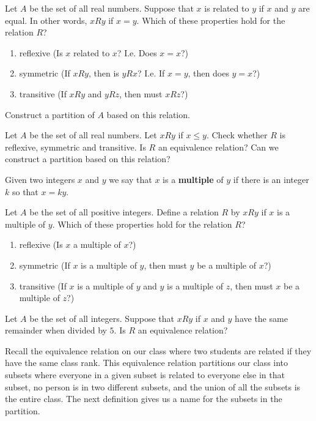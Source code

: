 \begin{prb}
\label{equiv1}
Let $A$ be the set of all real numbers. Suppose that $x$ is related to $y$ if $x$ and $y$ are equal. In other words, $xRy$ if $x=y$.  Which of these properties hold for the relation $R$?
\begin{enumerate}
\item reflexive (Is $x$ related to $x$? I.e. Does $x=x$?)
\item symmetric (If $xRy$, then is $yRx$? I.e. If $x=y$, then does $y=x$?)
\item transitive (If $xRy$ and $yRz$, then must $xRz$?)
\end{enumerate}
Construct a partition of $A$ based on this relation.
\end{prb}

\begin{prb}
Let $A$ be the set of all real numbers.  Let $xRy$ if $x \leq y$.   Check whether $R$ is reflexive, symmetric and transitive.  Is $R$ an equivalence relation?  Can we construct a partition based on this relation?
\end{prb}

\begin{dfn}
Given two integers $x$ and $y$ we say that $x$ is a \textbf{multiple} of $y$ if there is an integer $k$ so that $x=ky$.
\end{dfn}

\begin{prb}
Let $A$ be the set of all positive integers.  Define a relation $R$ by $xRy$ if $x$ is a multiple of $y$. Which of these properties hold for the relation $R$?
\begin{enumerate}
\item reflexive (Is $x$ a multiple of $x$?)
\item symmetric (If $x$ is a multiple of $y$, then must $y$ be a multiple of $x$?)
\item transitive (If $x$ is a multiple of $y$ and $y$ is a multiple of $z$, then must $x$ be a multiple of $z$?)
\end{enumerate}
\end{prb}

\begin{prb}
\label{equiv2}
Let $A$ be the set of all integers.  Suppose that $xRy$ if $x$ and $y$ have the same remainder when divided by $5$.  Is $R$ an equivalence relation?
\end{prb}

Recall the equivalence relation on our class where two students are related if they have the same class rank.   This equivalence relation partitions our class into subsets where everyone in a given subset is related to everyone else in that subset, no person is in two different subsets,  and the union of all the subsets is the entire class.  The next definition gives us a name for the subsets in the partition.

